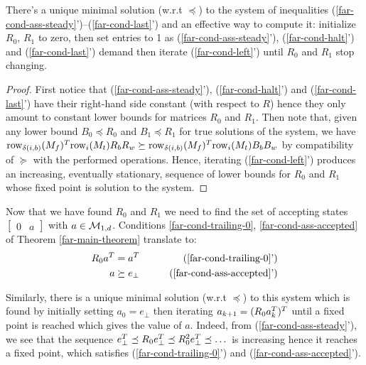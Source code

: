 \begin{lemma}\label{lem:far-unique-min}
  There's a unique minimal solution (w.r.t $\preceq$) to the system  of inequalities (\ref{far-cond-ass-steady}')--(\ref{far-cond-last}') and an effective way to compute it: initialize $R_0$, $R_1$ to zero,
  then set entries to 1 as (\ref{far-cond-ass-steady}'), (\ref{far-cond-halt}') and (\ref{far-cond-last}') demand then iterate (\ref{far-cond-left}') until $R_0$ and $R_1$ stop changing.
\end{lemma}
\begin{proof}

  First notice that (\ref{far-cond-ass-steady}'), (\ref{far-cond-halt}') and (\ref{far-cond-last}') have their right-hand side constant (with respect to $R$) hence they only amount to constant lower bounds for matrices $R_0$ and $R_1$. Then note that, given any lower bound $B_0\preceq R_0$ and $B_1\preceq R_1$ for true solutions of the system, we have  $\text{row}_{\delta(i,b)}(M_f)^T \text{row}_i(M_t)R_b R_w \succeq \text{row}_{\delta(i,b)}(M_f)^T \text{row}_i(M_t)B_b B_w$ by compatibility of $\succeq$ with the performed operations. Hence, iterating (\ref{far-cond-left}') produces an increasing, eventually stationary, sequence of lower bounds for $R_0$ and $R_1$ whose fixed point is solution to the system.
\end{proof}


Now that we have found $R_0$ and $R_1$ we need to find the set of accepting states $\begin{bmatrix}0&a\end{bmatrix}$ with $a \in \mathcal{M}_{1,d}$.
Conditions \eqref{far-cond-trailing-0}, \eqref{far-cond-ass-accepted} of Theorem \ref{far-main-theorem}   translate to:
\begin{align}
  R_0 a\T & = a\T
          &
  \tag{\ref{far-cond-trailing-0}'}
  \\
  a       & \succeq e_{\bot}
          &
  \tag{\ref{far-cond-ass-accepted}'}
\end{align}

Similarly, there is a unique minimal solution (w.r.t $\preceq$) to this system which is found by initially setting $a_0 = e_\bot$ then iterating $a_{k+1} = (R_0 a_{k}^T)^T$ until a fixed point is reached which gives the value of $a$. Indeed, from (\ref{far-cond-ass-steady}'), we see that the sequence $e_\bot^T \preceq  R_0 e_\bot^T\preceq R_0^2 e_\bot^T  \preceq\dots$ is increasing hence it reaches a fixed point, which satisfies (\ref{far-cond-trailing-0}') and (\ref{far-cond-ass-accepted}').

